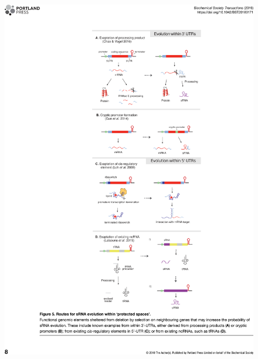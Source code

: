\begin{figure}
    \centering
    \includegraphics[width=\linewidth]{lit_review/page8.png}
\end{figure}
